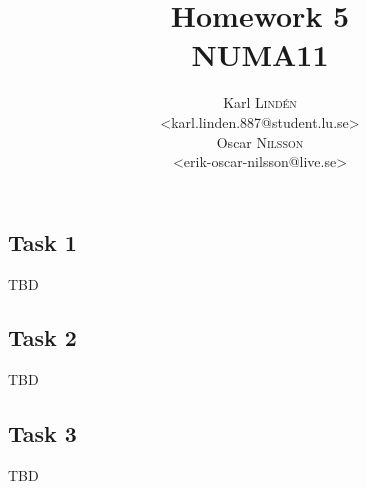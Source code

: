 \documentclass[a4paper,12pt]{article}
\begin{document}
\title{Homework 5 \\ NUMA11}
\author{
  Karl \textsc{Lind\'{e}n} \\
  <karl.linden.887@student.lu.se> \\
  Oscar \textsc{Nilsson} \\
  <erik-oscar-nilsson@live.se>
}

\maketitle
\thispagestyle{empty}

\newpage


\subsection*{Task 1}

TBD


\subsection*{Task 2}

TBD


\subsection*{Task 3}

TBD
\end{document}

